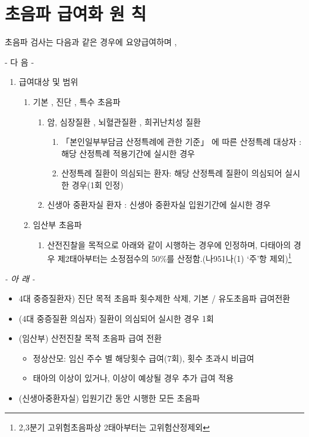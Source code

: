 ﻿\section{초음파 급여화 원 칙}
초음파 검사는 다음과 같은 경우에 요양급여하며 ,  \par

\textsf{- 다 음 -}
\begin{enumerate}[1.]\tightlist
\item 급여대상 및 범위
	\begin{enumerate}[가.]\tightlist
	\item 기본 , 진단 , 특수 초음파
		\begin{enumerate}[1)]
		\item 암, 심장질환 , 뇌혈관질환 , 희귀난치성 질환
			\begin{enumerate}[가)]\tightlist
			\item 「본인일부부담금 산정특례에 관한 기준」 에 따른 산정특례 대상자 : 해당 산정특례 적용기간에 실시한 경우
			\item 산정특례 질환이 의심되는 환자: 해당 산정특례 질환이 의심되어 실시한 경우(1회 인정)%
			\end{enumerate}
		\item 신생아 중환자실 환자 : 신생아 중환자실 입원기간에 실시한 경우
 		\end{enumerate}
	\item 임산부 초음파
		\begin{enumerate}[1)]
		\item 산전진찰을 목적으로 아래와 같이 시행하는 경우에 인정하며, 다태아의 경우 
	제2태아부터는 소정점수의 50\%를 산정함.(나951나(1) ‘주’항 제외)\footnote{2,3분기 고위험초음파상 2태아부터는 고위험산정제외}
		\end{enumerate}
	\end{enumerate}
\end{enumerate}	
\prezi{\clearpage}
\begin{center}\emph{- 아 래 -}\end{center}
\begin{myshadowbox}
\begin{itemize}\tightlist
\item 4대 중증질환자) 진단 목적 초음파 횟수제한 삭제, 기본 / 유도초음파 급여전환
\item (4대 중증질환 의심자) 질환이 의심되어 실시한 경우 1회
\item (임산부) 산전진찰 목적 초음파 급여 전환
	\begin{itemize}\tightlist
	\item 정상산모: 임신 주수 별 해당횟수 급여(7회), 횟수 초과시 비급여
	\item 태아의 이상이 있거나, 이상이 예상될 경우 추가 급여 적용
	\end{itemize}
\item (신생아중환자실) 입원기간 동안 시행한 모든 초음파
\end{itemize}
\end{myshadowbox}


